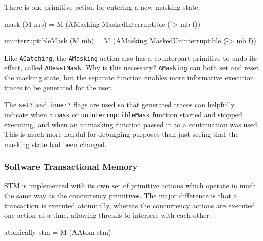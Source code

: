 
There is one primitive action for entering a new masking state:

\begin{haskellcode}
mask (M mb) = M (AMasking MaskedInterruptible (\f -> mb f))

uninterruptibleMask (M mb) = M (AMasking MaskedUninterruptible (\f -> mb f))
\end{haskellcode}


Like \verb|ACatching|, the \verb|AMasking| action also has a
counterpart primitive to undo its effect, called
\verb|AResetMask|. Why is this necessary? \verb|AMasking| can both set
and reset the masking state, but the separate function enables more
informative execution traces to be generated for the user.


The \verb|set?| and \verb|inner?| flags are used so that generated
traces can helpfully indicate when a \verb|mask| or
\verb|uninterruptibleMask| function started and stopped executing, and
when an unmasking function passed in to a continuation was used. This
is much more helpful for debugging purposes than just seeing that the
masking state had been changed.

\subsubsection{Software Transactional Memory}
\label{sec:execution-primops-stm}

STM is implemented with its own set of primitive actions which operate
in much the same way as the concurrency primitives. The major
difference is that a transaction is executed atomically, whereas the
concurrency actions are executed one action at a time, allowing
threads to interfere with each other.

\begin{haskellcode}
atomically stm = M (AAtom stm)
\end{haskellcode}


